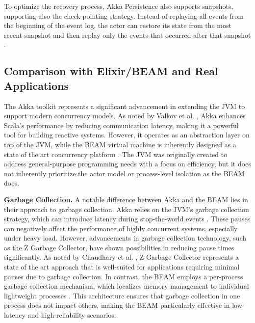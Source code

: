 To optimize the recovery process, Akka Persistence also supports snapshots, supporting also the check-pointing strategy. Instead of replaying all events from the beginning of the event log, the actor can restore its state from the most recent snapshot and then replay only the events that occurred after that snapshot \cite{Abraham2023,akka-docs}.

\subsection{Comparison with Elixir/BEAM and Real Applications}

The Akka toolkit represents a significant advancement in extending the \gls{JVM} to support modern concurrency models. As noted by Valkov et al. \cite{Valkov2018}, Akka enhances Scala’s performance by reducing communication latency, making it a powerful tool for building reactive systems. However, it operates as an abstraction layer on top of the \gls{JVM}, while the \gls{BEAM} virtual machine is inherently designed as a state of the art concurrency platform \cite{erlang-concurrency-blog}. The \gls{JVM} was originally created to address general-purpose programming needs with a focus on efficiency, but it does not inherently prioritize the actor model or process-level isolation as the \gls{BEAM} does.

\textbf{Garbage Collection.} A notable difference between Akka and the \gls{BEAM} lies in their approach to garbage collection. Akka relies on the \gls{JVM}’s garbage collection strategy, which can introduce latency during stop-the-world events \cite{akka-docs,Abraham2023}. These pauses can negatively affect the performance of highly concurrent systems, especially under heavy load. However, advancements in garbage collection technology, such as the Z Garbage Collector, have shown possibilities in reducing pause times significantly. As noted by Chaudhary et al. \cite{Chaudhary2024}, Z Garbage Collector represents a state of the art approach that is well-suited for applications requiring minimal pauses due to garbage collection. In contrast, the \gls{BEAM} employs a per-process garbage collection mechanism, which localizes memory management to individual lightweight processes \cite{Juric2024}. This architecture ensures that garbage collection in one process does not impact others, making the \gls{BEAM} particularly effective in low-latency and high-reliability scenarios.

